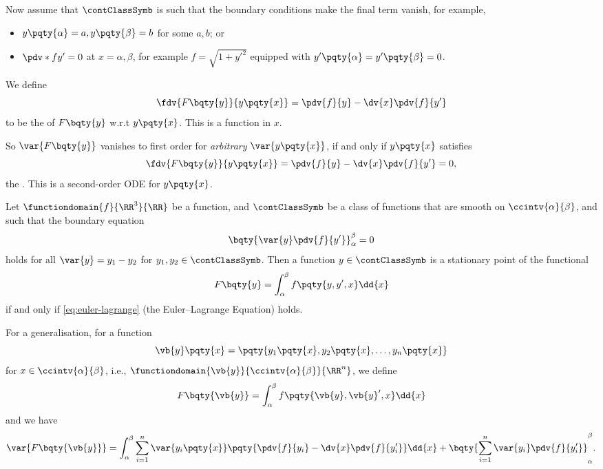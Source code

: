 Now assume that \(\contClassSymb\) is such that the boundary conditions make the final term vanish, for example,
\begin{itemize}
    \item \(y\pqty{\alpha} = a, y\pqty{\beta} = b\) for some \(a, b\); or
    \item \(\pdv*{f}{y'} = 0\) at \(x = \alpha, \beta\), for example \(f = \sqrt{1 + y'^2}\) equipped with \(y'\pqty{\alpha} = y'\pqty{\beta} = 0\).
\end{itemize}

\begin{definition}
    \label{def:functional-derivative}%
    We define
    \[
        \fdv{F\bqty{y}}{y\pqty{x}} = \pdv{f}{y} - \dv{x} \pdv{f}{y'}
    \]
    to be the  of \(F\bqty{y}\) w.r.t \(y\pqty{x}\). This is a function in \(x\).
\end{definition}

So \(\var{F\bqty{y}}\) vanishes to first order for \emph{arbitrary} \(\var{y\pqty{x}}\), if and only if \(y\pqty{x}\) satisfies
\begin{equation}
    \fdv{F\bqty{y}}{y\pqty{x}} = \pdv{f}{y} - \dv{x} \pdv{f}{y'} = 0,
    \label{eq:euler-lagrange}
\end{equation}
the . This is a second-order ODE for \(y\pqty{x}\).

\begin{theorem}
    Let \(\functiondomain{f}{\RR^3}{\RR}\) be a function, and \(\contClassSymb\) be a class of functions that are smooth on \(\ccintv{\alpha}{\beta}\), and such that the boundary equation
    \[
        \bqty{\var{y} \pdv{f}{y'}}_{\alpha}^{\beta} = 0
    \]
    holds for all \(\var{y} = y_1 - y_2\) for \(y_1, y_2 \in \contClassSymb\). Then a function \(y \in \contClassSymb\) is a stationary point of the functional
    \[
        F\bqty{y} = \int_{\alpha}^{\beta} f\pqty{y, y', x} \dd{x}
    \]
    if and only if \eqref{eq:euler-lagrange} (the Euler--Lagrange Equation) holds.
\end{theorem}

For a generalisation, for a function
\[
    \vb{y} \pqty{x} = \pqty{y_1 \pqty{x}, y_2 \pqty{x}, \ldots, y_n \pqty{x}}
\]
for \(x \in \ccintv{\alpha}{\beta}\), i.e., \(\functiondomain{\vb{y}}{\ccintv{\alpha}{\beta}}{\RR^n}\), we define
\[
    F\bqty{\vb{y}} = \int_{\alpha}^{\beta} f\pqty{\vb{y}, \vb{y}', x} \dd{x}
\]
and we have
\[
    \var{F\bqty{\vb{y}}} = \int_{\alpha}^{\beta} \sum_{i = 1}^{n} \var{y_i \pqty{x}} \pqty{\pdv{f}{y_i} - \dv{x} \pdv{f}{y'_i}} \dd{x} + \bqty{\sum_{i = 1}^{n} \var{y_i} \pdv{f}{y_i'}}_{\alpha}^{\beta}.
\]

